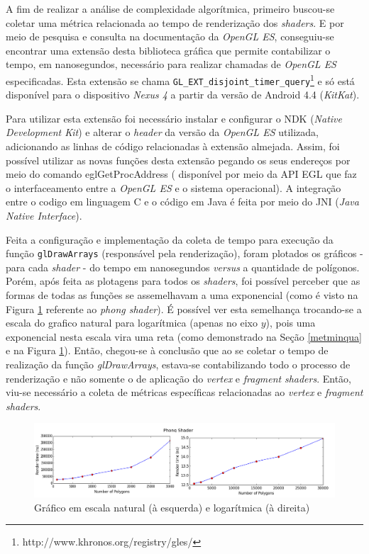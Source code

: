 	A fim de realizar a análise de complexidade algorítmica, primeiro buscou-se coletar uma métrica relacionada ao tempo de renderização dos \textit{shaders}. E por meio de pesquisa e consulta na documentação da \textit{OpenGL ES}, conseguiu-se encontrar uma extensão desta biblioteca gráfica que permite contabilizar o tempo, em nanosegundos, necessário para realizar chamadas de \textit{OpenGL ES} especificadas. Esta extensão se chama \texttt{GL\_EXT\_disjoint\_timer\_query}\footnote{http://www.khronos.org/registry/gles/} e só está disponível para o dispositivo \textit{Nexus 4} a partir da versão de Android 4.4 (\textit{KitKat}).

	Para utilizar esta extensão foi necessário instalar e configurar o NDK (\textit{Native Development Kit}) e alterar o \textit{header} da versão da \textit{OpenGL ES} utilizada, adicionando as linhas de código relacionadas à extensão almejada. Assim, foi possível utilizar as novas funções desta extensão pegando os seus endereços por meio do comando eglGetProcAddress ( disponível por meio da API EGL que faz o interfaceamento entre a \textit{OpenGL ES} e o sistema operacional). A integração entre o codigo em linguagem C e o código em Java é feita por meio do JNI (\textit{Java Native Interface}).

	Feita a configuração e implementação da coleta de tempo para execução da função \texttt{glDrawArrays} (responsável pela renderização), foram plotados os gráficos - para cada \textit{shader} - do tempo em nanosegundos \textit{versus} a quantidade de polígonos. Porém, após feita as plotagens para todos os \textit{shaders}, foi possível perceber que as formas de todas as funções se assemelhavam a uma exponencial (como é visto na Figura  \ref{ndk_exp} referente ao \textit{phong shader}). É possível ver esta semelhança trocando-se a escala do grafico natural para logarítmica (apenas no eixo $y$), pois uma exponencial nesta escala vira uma reta (como demonstrado na Seção \ref{metminqua} e na  Figura  \ref{ndk_exp}). Então, chegou-se à conclusão que ao se coletar o tempo de realização da função \textit{glDrawArrays}, estava-se contabilizando todo o processo de renderização e não somente o de aplicação do \textit{vertex} e  \textit{fragment}  \textit{shaders}. Então, viu-se necessário a coleta de métricas específicas relacionadas ao \textit{vertex} e \textit{fragment} \textit{shaders}. 

	\begin{figure}[ht]
	\centering
		\includegraphics[keepaspectratio=true,scale=0.42]{figuras/ndk_exp.png}
	\caption{Gráfico em escala natural (à esquerda) e logarítmica (à direita)}
	\label{ndk_exp}
	\end{figure}

